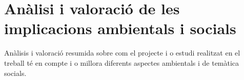 \chapter{Anàlisi i valoració de les implicacions ambientals i socials}

Anàlisis i valoració resumida sobre com el projecte i o estudi realitzat en el treball té en compte i o millora diferents aspectes ambientals i de temàtica socials.